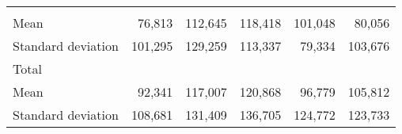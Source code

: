 \begin{tabular}{llllll}
  \multicolumn{1}{|r}{} &
  \multicolumn{1}{r}{} &
  \multicolumn{1}{r}{} &
  \multicolumn{1}{r}{} &
  \multicolumn{1}{r}{} \\
\multicolumn{1}{l}{\hspace{4em}Mean} &
  \multicolumn{1}{|r}{76,813} &
  \multicolumn{1}{r}{112,645} &
  \multicolumn{1}{r}{118,418} &
  \multicolumn{1}{r}{101,048} &
  \multicolumn{1}{r}{80,056} \\
\multicolumn{1}{l}{\hspace{4em}Standard deviation} &
  \multicolumn{1}{|r}{101,295} &
  \multicolumn{1}{r}{129,259} &
  \multicolumn{1}{r}{113,337} &
  \multicolumn{1}{r}{79,334} &
  \multicolumn{1}{r}{103,676} \\
\multicolumn{1}{l}{\hspace{3em}Total} &
  \multicolumn{1}{|r}{} &
  \multicolumn{1}{r}{} &
  \multicolumn{1}{r}{} &
  \multicolumn{1}{r}{} &
  \multicolumn{1}{r}{} \\
\multicolumn{1}{l}{\hspace{4em}Mean} &
  \multicolumn{1}{|r}{92,341} &
  \multicolumn{1}{r}{117,007} &
  \multicolumn{1}{r}{120,868} &
  \multicolumn{1}{r}{96,779} &
  \multicolumn{1}{r}{105,812} \\
\multicolumn{1}{l}{\hspace{4em}Standard deviation} &
  \multicolumn{1}{|r}{108,681} &
  \multicolumn{1}{r}{131,409} &
  \multicolumn{1}{r}{136,705} &
  \multicolumn{1}{r}{124,772} &
  \multicolumn{1}{r}{123,733} \\
\cline{1-6}
\end{tabular}
